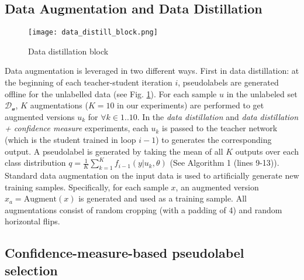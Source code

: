 \documentclass{article}
\begin{document}
\subsection{Data Augmentation and Data Distillation}
\begin{figure}[h]
\texttt{[image: data\_distill\_block.png]}
\caption{Data distillation block}
\label{data_distill}
\end{figure}

Data augmentation is leveraged in two different ways. First in data distillation: at the beginning of each teacher-student iteration $i$, pseudolabels are generated offline for the unlabelled data (see Fig. \ref{data_distill}). For each sample $u$ in the unlabeled set $\mathcal{D_{u}}$, $K$ augmentations ($K=10$ in our experiments) are performed to get augmented versions $u_{k}$ for $\forall k  \in 1..10$. In the \textit{data distillation} and \textit{data distillation + confidence measure} experiments, each $u_{k}$ is passed to the teacher network (which is the student trained in loop $i-1$) to generates the corresponding output. A pseudolabel is generated by taking the mean of all $K$ outputs over each class distribution $q = \frac{1}{K} \sum_{k=1}^{K} f_{i-1}(y | u_{k}, \theta)$ (See Algorithm 1 (lines 9-13)). 
\newline 
Standard data augmentation on the input data is used to artificially generate new training samples. Specifically, for each sample $x$, an augmented version $x_{a}=\text{Augment}(x)$ is generated and used as a training sample. 
\newline
All augmentations consist of random cropping (with a padding of 4) and random horizontal flips.

\subsection{Confidence-measure-based pseudolabel selection}
\end{document}
